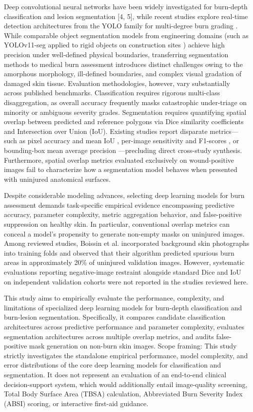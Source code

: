\documentclass[11pt,a4paper]{article}
\begin{document}
Deep convolutional neural networks have been widely investigated for burn-depth classification \cite{cirillo2019} and lesion segmentation [4, 5], while recent studies explore real-time detection architectures from the YOLO family for multi-degree burn grading \cite{sevik2026}. While comparable object segmentation models from engineering domains (such as YOLOv11-seg applied to rigid objects on construction sites \cite{he2024}) achieve high precision under well-defined physical boundaries, transferring segmentation methods to medical burn assessment introduces distinct challenges owing to the amorphous morphology, ill-defined boundaries, and complex visual gradation of damaged skin tissue. Evaluation methodologies, however, vary substantially across published benchmarks. Classification requires rigorous multi-class disaggregation, as overall accuracy frequently masks catastrophic under-triage on minority or ambiguous severity grades. Segmentation requires quantifying spatial overlap between predicted and reference polygons via Dice similarity coefficients and Intersection over Union (IoU). Existing studies report disparate metrics---such as pixel accuracy and mean IoU \cite{liu2021}, per-image sensitivity and F1-scores \cite{boissin2023}, or bounding-box mean average precision \cite{sevik2026}---precluding direct cross-study synthesis. Furthermore, spatial overlap metrics evaluated exclusively on wound-positive images fail to characterize how a segmentation model behaves when presented with uninjured anatomical surfaces.

Despite considerable modeling advances, selecting deep learning models for burn assessment demands task-specific empirical evidence encompassing predictive accuracy, parameter complexity, metric aggregation behavior, and false-positive suppression on healthy skin. In particular, conventional overlap metrics can conceal a model's propensity to generate non-empty masks on uninjured images. Among reviewed studies, Boissin et al. \cite{boissin2023} incorporated background skin photographs into training folds and observed that their algorithm predicted spurious burn areas in approximately 20\% of uninjured validation images. However, systematic evaluations reporting negative-image restraint alongside standard Dice and IoU on independent validation cohorts were not reported in the studies reviewed here.

This study aims to empirically evaluate the performance, complexity, and limitations of specialized deep learning models for burn-depth classification and burn-lesion segmentation. Specifically, it compares candidate classification architectures across predictive performance and parameter complexity, evaluates segmentation architectures across multiple overlap metrics, and audits false-positive mask generation on non-burn skin images. Scope framing: This study strictly investigates the standalone empirical performance, model complexity, and error distributions of the core deep learning models for classification and segmentation. It does not represent an evaluation of an end-to-end clinical decision-support system, which would additionally entail image-quality screening, Total Body Surface Area (TBSA) calculation, Abbreviated Burn Severity Index (ABSI) scoring, or interactive first-aid guidance.
\end{document}
